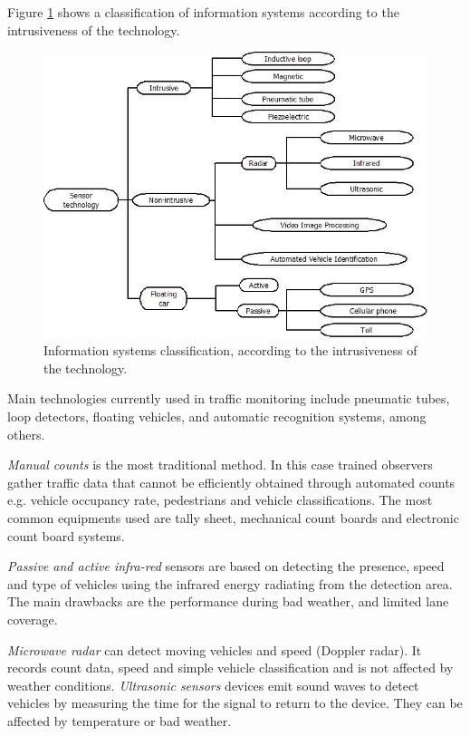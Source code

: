 \documentclass[preprint,authoryear,12pt]{elsarticle}
\begin{document}
Figure \ref{tipossensores} shows a classification of information systems according to the intrusiveness of the technology.

\begin{figure}[htpb] 
\begin{center} 
\includegraphics[scale=0.55]{intrusivos.jpeg}  %
\end{center} 
\caption{Information systems classification, according to the intrusiveness of the technology.} 
\label{tipossensores} 
\end{figure}

Main technologies currently used in traffic monitoring include pneumatic tubes, loop detectors, floating vehicles, and automatic recognition systems, among others.


\emph{Manual counts} is the most traditional method. In this case trained observers gather traffic data that cannot be efficiently obtained through automated counts e.g. vehicle occupancy rate, pedestrians and vehicle classifications. The most common equipments used are tally sheet, mechanical count boards and electronic count board systems.

\emph{Passive and active infra-red} sensors are based on detecting the presence, speed and type of vehicles using the infrared energy radiating from the detection area. The main drawbacks are the performance during bad weather, and limited lane coverage.

\emph{Microwave radar} can detect moving vehicles and speed (Doppler radar). It records count data, speed and simple vehicle classification and is not affected by weather conditions.
\emph{Ultrasonic sensors} devices emit sound waves to detect vehicles by measuring the time for the signal to return to the device. They can be affected by temperature or bad weather. 
\end{document}
